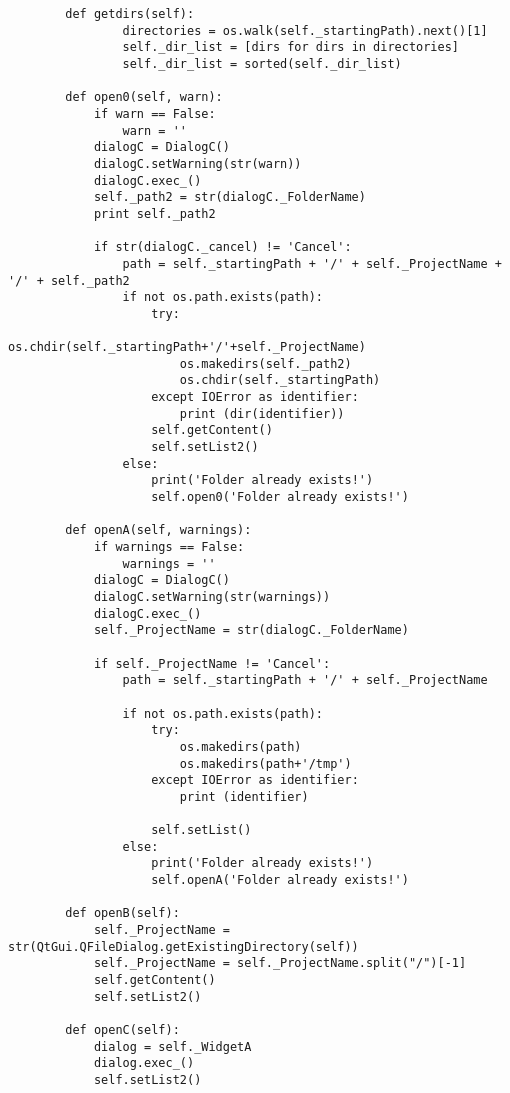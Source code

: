 \begin{verbatim}
        def getdirs(self):
                directories = os.walk(self._startingPath).next()[1]
                self._dir_list = [dirs for dirs in directories]
                self._dir_list = sorted(self._dir_list)
    
        def open0(self, warn):
            if warn == False:
                warn = ''
            dialogC = DialogC()
            dialogC.setWarning(str(warn))
            dialogC.exec_()
            self._path2 = str(dialogC._FolderName)
            print self._path2
    
            if str(dialogC._cancel) != 'Cancel':
                path = self._startingPath + '/' + self._ProjectName + '/' + self._path2
                if not os.path.exists(path):
                    try:
                        os.chdir(self._startingPath+'/'+self._ProjectName)
                        os.makedirs(self._path2)
                        os.chdir(self._startingPath)
                    except IOError as identifier:
                        print (dir(identifier))
                    self.getContent()
                    self.setList2()
                else:
                    print('Folder already exists!')
                    self.open0('Folder already exists!')
    
        def openA(self, warnings):
            if warnings == False:
                warnings = ''
            dialogC = DialogC()
            dialogC.setWarning(str(warnings))
            dialogC.exec_()
            self._ProjectName = str(dialogC._FolderName)
    
            if self._ProjectName != 'Cancel':
                path = self._startingPath + '/' + self._ProjectName
   
                if not os.path.exists(path):
                    try:
                        os.makedirs(path)
                        os.makedirs(path+'/tmp')
                    except IOError as identifier:
                        print (identifier)
   
                    self.setList()
                else:
                    print('Folder already exists!')
                    self.openA('Folder already exists!')
    
        def openB(self):
            self._ProjectName = str(QtGui.QFileDialog.getExistingDirectory(self))
            self._ProjectName = self._ProjectName.split("/")[-1]
            self.getContent()
            self.setList2()
    
        def openC(self):
            dialog = self._WidgetA
            dialog.exec_()
            self.setList2()
    

\end{verbatim}
